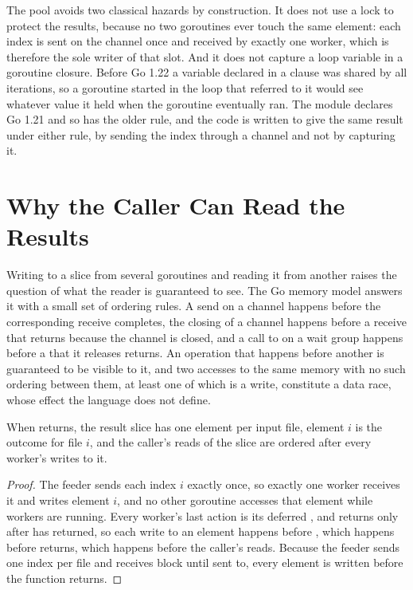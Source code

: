 The pool avoids two classical hazards by construction. It does not use a lock to protect the results, because no two goroutines ever touch the same element: each index is sent on the channel once and received by exactly one worker, which is therefore the sole writer of that slot. And it does not capture a loop variable in a goroutine closure. Before Go 1.22 a variable declared in a  clause was shared by all iterations, so a goroutine started in the loop that referred to it would see whatever value it held when the goroutine eventually ran. The module declares Go 1.21 and so has the older rule, and the code is written to give the same result under either rule, by sending the index through a channel and not by capturing it.

\section{Why the Caller Can Read the Results}

Writing to a slice from several goroutines and reading it from another raises the question of what the reader is guaranteed to see. The Go memory model answers it with a small set of ordering rules. A send on a channel happens before the corresponding receive completes, the closing of a channel happens before a receive that returns because the channel is closed, and a call to  on a wait group happens before a  that it releases returns. An operation that happens before another is guaranteed to be visible to it, and two accesses to the same memory with no such ordering between them, at least one of which is a write, constitute a data race, whose effect the language does not define.

\begin{proposition}\label{prop:pool}
When  returns, the result slice has one element per input file, element $i$ is the outcome for file $i$, and the caller's reads of the slice are ordered after every worker's writes to it.
\end{proposition}

\begin{proof}
The feeder sends each index $i$ exactly once, so exactly one worker receives it and writes element $i$, and no other goroutine accesses that element while workers are running. Every worker's last action is its deferred , and  returns only after  has returned, so each write to an element happens before , which happens before  returns, which happens before the caller's reads. Because the feeder sends one index per file and receives block until sent to, every element is written before the function returns.
\end{proof}

